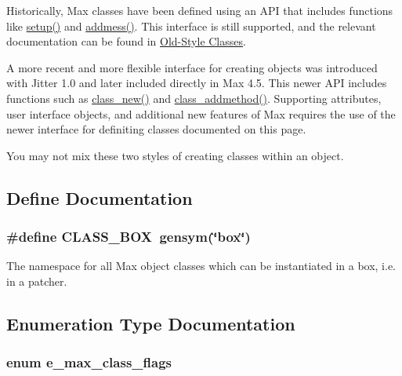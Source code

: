 Historically, Max classes have been defined using an API that includes functions like \hyperlink{group__class__old_ga24bbc5a9e8f7bb0a1c6847326e2f0a20}{setup()} and \hyperlink{group__class__old_ga0d9bfa416fdd861d1b2fd2d17701cbb3}{addmess()}. This interface is still supported, and the relevant documentation can be found in \hyperlink{group__class__old}{Old-\/Style Classes}.

A more recent and more flexible interface for creating objects was introduced with Jitter 1.0 and later included directly in Max 4.5. This newer API includes functions such as \hyperlink{group__class_ga238696d466081965c2b72b3880358404}{class\_\-new()} and \hyperlink{group__class_ga1fabf54e0cec8d4e5f732fa347b3f874}{class\_\-addmethod()}. Supporting attributes, user interface objects, and additional new features of Max requires the use of the newer interface for definiting classes documented on this page.

You may not mix these two styles of creating classes within an object. 

\subsection{Define Documentation}
\hypertarget{group__class_gaf640c99a1fceb8158c2d1e77381b0320}{
\subsubsection[{CLASS\_\-BOX}]{\setlength{\rightskip}{0pt plus 5cm}\#define CLASS\_\-BOX~gensym(\char`\"{}box\char`\"{})}}
\label{group__class_gaf640c99a1fceb8158c2d1e77381b0320}


The namespace for all Max object classes which can be instantiated in a box, i.e. in a patcher. 

\subsection{Enumeration Type Documentation}
\hypertarget{group__class_ga124a08e1744d9e999211abaa9df9f556}{
\subsubsection[{e\_\-max\_\-class\_\-flags}]{\setlength{\rightskip}{0pt plus 5cm}enum {\bf e\_\-max\_\-class\_\-flags}}}
\label{group__class_ga124a08e1744d9e999211abaa9df9f556}


